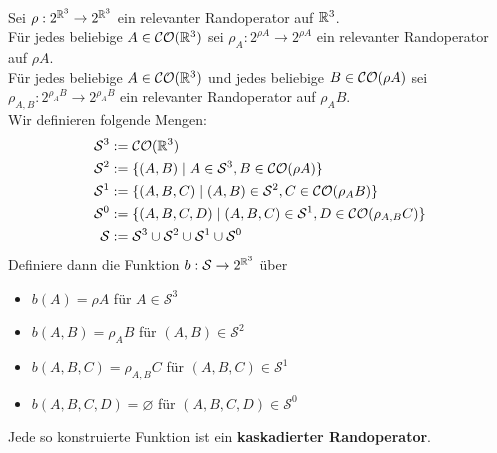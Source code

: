     
    \begin{dfn} \ \vspace{8pt}

        \noindent
        Sei $\rho: 2^{\mathbb{R}^3} \to 2^{\mathbb{R}^3}$ ein relevanter Randoperator auf $\mathbb{R}^3$.\\
        Für jedes beliebige $A \in \mathcal{CO}(\mathbb{R}^3)$ sei $\rho_A : 2^{\rho A} \to 2^{\rho A}$ ein relevanter Randoperator auf $\rho A$.\\
        Für jedes beliebige $A \in \mathcal{CO}(\mathbb{R}^3)$ und jedes beliebige $B \in \mathcal{CO}(\rho A)$ sei $\rho_{A,B} : 2^{\rho_A B} \to 2^{\rho_A B}$ ein relevanter Randoperator auf $\rho_A B$.\\
        Wir definieren folgende Mengen:
        \begin{align*}
            \mathcal{S}^3 &:= \mathcal{CO}(\mathbb{R}^3) \\
            \mathcal{S}^2 &:= \{(A,B) \mid A \in \mathcal{S}^3, B \in \mathcal{CO}(\rho A)\} \\
            \mathcal{S}^1 &:= \{(A,B,C) \mid (A,B) \in \mathcal{S}^2, C \in \mathcal{CO}(\rho_A B)\} \\
            \mathcal{S}^0 &:= \{(A,B,C,D) \mid (A,B,C) \in \mathcal{S}^1, D \in \mathcal{CO}(\rho_{A,B} C)\}\\
            \mathcal{S} &:= \mathcal{S}^3 \cup \mathcal{S}^2 \cup \mathcal{S}^1 \cup \mathcal{S}^0
        \end{align*}
        Definiere dann die Funktion $b : \mathcal{S} \to 2^{\mathbb{R}^3}$ über
        \begin{itemize}
            \item $b(A) = \rho A$ für $A \in \mathcal{S}^3$
            \item $b(A,B) = \rho_A B$ für $(A,B) \in \mathcal{S}^2$
            \item $b(A,B,C) = \rho_{A,B} C$ für $(A,B,C) \in \mathcal{S}^1$
            \item $b(A,B,C,D) = \varnothing$ für $(A,B,C,D) \in \mathcal{S}^0$
        \end{itemize}
        Jede so konstruierte Funktion ist ein \textbf{kaskadierter Randoperator}.
    \end{dfn}
    
    
    
    
